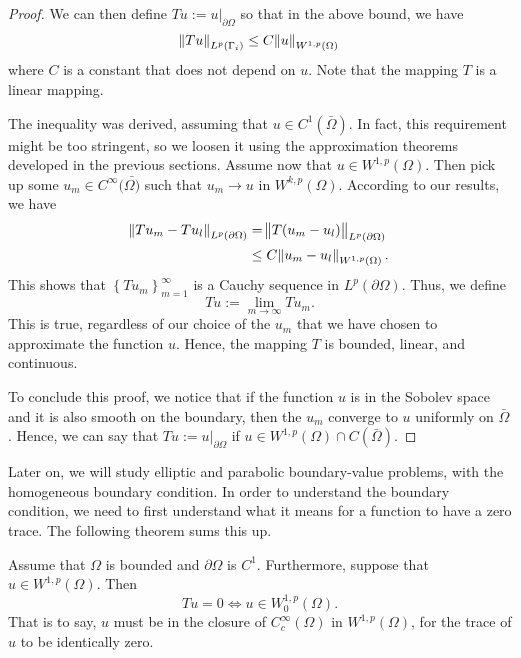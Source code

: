 \documentclass[10pt]{article}
\begin{document}
\begin{proof}
	We can then define $Tu := u|_{\partial \Omega}$ so that in the above bound, we have
	\begin{equation*}
		\displaystyle \norm{Tu}_{L^p(\Gamma_i)} \leq C\norm{u}_{W^{1,p}(\Omega)}
	\end{equation*}
	where $C$ is a constant that does not depend on $u$. Note that the mapping $T$ is a linear mapping. 
	
	The inequality was derived, assuming that $u \in C^1(\bar{\Omega})$. In fact, this requirement might be too stringent, so we loosen it using the approximation theorems developed in the previous sections. Assume now that $u \in W^{1,p}(\Omega)$. Then pick up some $u_m \in C^\infty(\bar{\Omega)}$ such that $u_m \to u$ in $W^{k,p}(\Omega)$. According to our results, we have 
	\begin{align*}
		\displaystyle \norm{Tu_m - Tu_l}_{L^p(\partial \Omega)} &= \norm{T(u_m - u_l)}_{L^p(\partial \Omega)} \\
		&\leq C\norm{u_m - u_l}_{W^{1,p}(\Omega)}.
	\end{align*}
	This shows that $\left\{Tu_m\right\}_{m=1}^{\infty}$ is a Cauchy sequence in $L^p(\partial \Omega)$. Thus, we define 
	\begin{equation*}
		\displaystyle Tu := \lim\limits_{m \to \infty}{Tu_m}.
	\end{equation*}
	This is true, regardless of our choice of the $u_m$ that we have chosen to approximate the function $u$. Hence, the mapping $T$ is bounded, linear, and continuous. 
	
	To conclude this proof, we notice that if the function $u$ is in the Sobolev space and it is also smooth on the boundary, then the $u_m$ converge to $u$ uniformly on $\bar{\Omega}$. Hence, we can say that $Tu := u|_{\partial \Omega}$ if $u \in W^{1,p}(\Omega) \cap C(\bar{\Omega})$.
\end{proof}
Later on, we will study elliptic and parabolic boundary-value problems, with the homogeneous boundary condition. In order to understand the boundary condition, we need to first understand what it means for a function to have a zero trace. The following theorem sums this up.
\begin{theorem}
	Assume that $\Omega$ is bounded and $\partial \Omega$ is $C^1$. Furthermore, suppose that $u \in W^{1,p}(\Omega)$. Then 
	\begin{equation*}
		\displaystyle Tu = 0 \iff u \in W^{1,p}_0(\Omega). 
	\end{equation*} 
	That is to say, $u$ must be in the closure of $C^\infty_c(\Omega)$ in $W^{1,p}(\Omega)$, for the trace of $u$ to be identically zero. 
\end{theorem}
\end{document}
